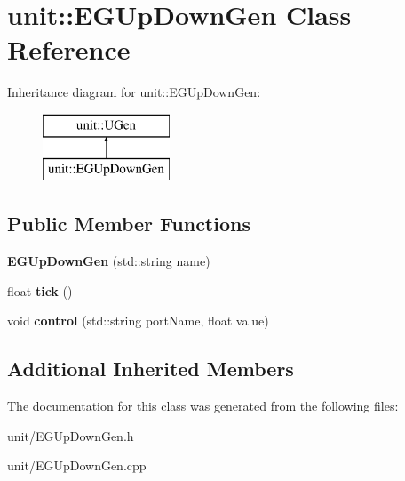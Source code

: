 \hypertarget{classunit_1_1EGUpDownGen}{}\section{unit\+:\+:E\+G\+Up\+Down\+Gen Class Reference}
\label{classunit_1_1EGUpDownGen}
Inheritance diagram for unit\+:\+:E\+G\+Up\+Down\+Gen\+:\begin{figure}[H]
\begin{center}
\leavevmode
\includegraphics[height=2.000000cm]{classunit_1_1EGUpDownGen}
\end{center}
\end{figure}
\subsection*{Public Member Functions}
\begin{DoxyCompactItemize}
\item 
{\bfseries E\+G\+Up\+Down\+Gen} (std\+::string name)\hypertarget{classunit_1_1EGUpDownGen_abc35a572da36fa26f4b54beabfc6268e}{}\label{classunit_1_1EGUpDownGen_abc35a572da36fa26f4b54beabfc6268e}

\item 
float {\bfseries tick} ()\hypertarget{classunit_1_1EGUpDownGen_abea11de5389345064a8395d54411e3b3}{}\label{classunit_1_1EGUpDownGen_abea11de5389345064a8395d54411e3b3}

\item 
void {\bfseries control} (std\+::string port\+Name, float value)\hypertarget{classunit_1_1EGUpDownGen_ac1ef59d9023034c17b46e09bfae15178}{}\label{classunit_1_1EGUpDownGen_ac1ef59d9023034c17b46e09bfae15178}

\end{DoxyCompactItemize}
\subsection*{Additional Inherited Members}


The documentation for this class was generated from the following files\+:\begin{DoxyCompactItemize}
\item 
unit/E\+G\+Up\+Down\+Gen.\+h\item 
unit/E\+G\+Up\+Down\+Gen.\+cpp\end{DoxyCompactItemize}
